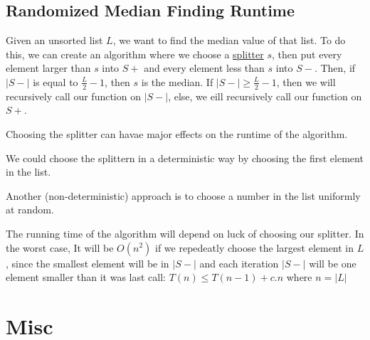 \documentclass{article}
\begin{document}
\subsection{Randomized Median Finding Runtime}
Given an unsorted list $L$, we want to find the median value of that list. To do this, 
we can create an algorithm where we choose a \underline{splitter} $s$, then put every element
larger than $s$ into $S+$ and every element less than $s$ into $S-$. Then, if  $|S-|$ is
equal to $\frac{L}{2}-1$, then $s$ is the median. If $|S-| \geq \frac{L}{2}-1$, then we will
recursively call our function on $|S-|$, else, we eill recursively call our function on $S+$. 

Choosing the splitter can havae major effects on the runtime of the algorithm.

We could choose the splittern in a deterministic way by choosing the first element in the list.

Another (non-deterministic) approach is to choose a number in the list uniformly at random. 

The running time of the algorithm will depend on luck of choosing our splitter. In the worst case, 
It will be $O(n^2)$ if we repedeatly choose the largest element in $L$, since the smallest element
will be in $|S-|$ and each iteration $|S-|$ will be one element smaller than it was last call: $T(n) \leq T(n-1) + c.n$
where $n = |L|$

\section{Misc}
\end{document}
